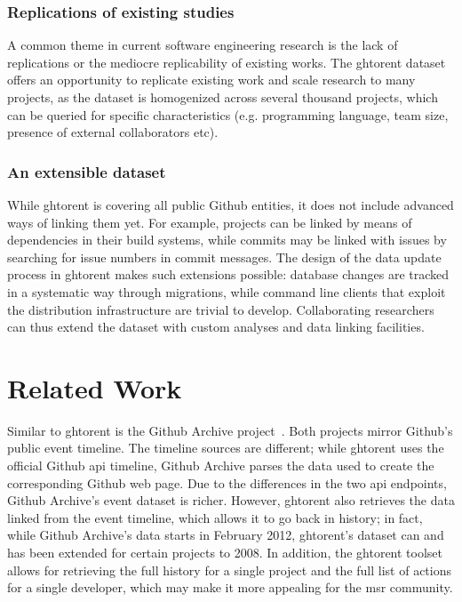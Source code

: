 \documentclass[conference]{IEEEtran}
\begin{document}
\subsubsection{Replications of existing studies} A common theme in current
software engineering research is the lack of replications or the
mediocre replicability of existing works. The {\sc ght}orent dataset offers
an opportunity to replicate existing work and scale research to many
projects, as the dataset is homogenized across several thousand projects,
which can be queried for specific characteristics (e.g. programming language,
team size, presence of external collaborators etc).

\subsubsection{An extensible dataset} While {\sc ght}orent is covering all 
 public Github entities, it does not include advanced ways of
linking them yet. For example, projects can be linked by means of dependencies
in their build systems, while commits may be linked with issues by
searching for issue numbers in commit messages. The design of the
data update process in {\sc ght}orent makes such extensions possible:
database changes are tracked in a systematic way through migrations, while  
command line clients that exploit the distribution infrastructure are
trivial to develop. Collaborating researchers can thus extend the dataset
with custom analyses and data linking facilities.


\section{Related Work}

Similar to {\sc ght}orent is the Github Archive project~\cite{Grigo13}.  Both
projects mirror Github's public event timeline. The timeline sources are
different; while {\sc ght}orent uses the official Github {\sc api} timeline, Github
Archive parses the data used to create the corresponding Github web page.  Due
to the differences in the two {\sc api} endpoints, Github Archive's event
dataset is richer.  However, {\sc ght}orent also retrieves the data linked from the
event timeline, which allows it to go back in history; in fact, while Github
Archive's data starts in February 2012, {\sc ght}orent's dataset can and has been
extended for certain projects to 2008.  In addition, the {\sc ght}orent toolset
allows for retrieving the full history for a single project and the full list of
actions for a single developer, which may make it more appealing for the {\sc
msr} community.
\end{document}
